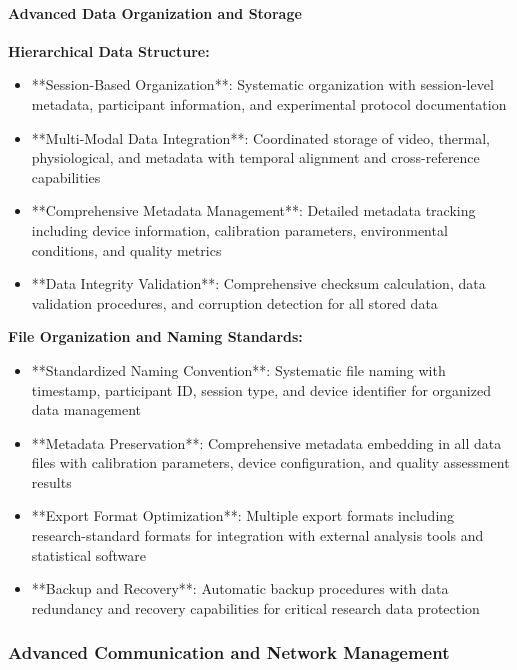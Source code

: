 \documentclass[12pt,a4paper]{article}
\begin{document}
\paragraph{Advanced Data Organization and Storage}

\textbf{Hierarchical Data Structure:}

\begin{itemize}
\item **Session-Based Organization**: Systematic organization with session-level metadata, participant information, and
  experimental protocol documentation
\item **Multi-Modal Data Integration**: Coordinated storage of video, thermal, physiological, and metadata with temporal
  alignment and cross-reference capabilities
\item **Comprehensive Metadata Management**: Detailed metadata tracking including device information, calibration
  parameters, environmental conditions, and quality metrics
\item **Data Integrity Validation**: Comprehensive checksum calculation, data validation procedures, and corruption
  detection for all stored data

\end{itemize}
\textbf{File Organization and Naming Standards:}

\begin{itemize}
\item **Standardized Naming Convention**: Systematic file naming with timestamp, participant ID, session type, and device
  identifier for organized data management
\item **Metadata Preservation**: Comprehensive metadata embedding in all data files with calibration parameters, device
  configuration, and quality assessment results
\item **Export Format Optimization**: Multiple export formats including research-standard formats for integration with
  external analysis tools and statistical software
\item **Backup and Recovery**: Automatic backup procedures with data redundancy and recovery capabilities for critical
  research data protection

\end{itemize}
\subsubsection{Advanced Communication and Network Management}
\end{document}
